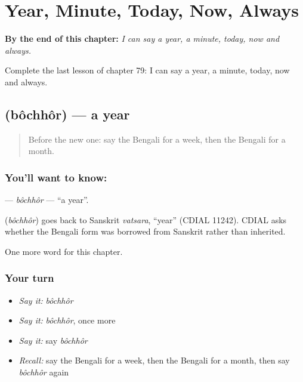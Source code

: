 
\chapter{Year, Minute, Today, Now, Always}
\label{ch:bn-year-minute-today-now-always}

\begin{chapteropening}
\textbf{By the end of this chapter:} \emph{I can say a year, a minute, today, now and always.}

Complete the last lesson of chapter 79: I can say a year, a minute, today, now and always.
\end{chapteropening}

\section[\texorpdfstring{\bn{বছর} (bôchhôr)}{বছর (bôchhôr)}]{ (bôchhôr) — a year}

\label{lesson:BN-C79-bochhor}



\begin{quote}
Before the new one: say the Bengali for a week, then the Bengali for a month.
\end{quote}

\subsection*{You'll want to know: }
\textbf{} — \emph{bôchhôr} — \textquotedblleft{}a year\textquotedblright{}.

\begin{cousinweb}
\textbf{} (\emph{bôchhôr}) goes back to Sanskrit \emph{vatsara}, \textquotedblleft{}year\textquotedblright{} (CDIAL 11242). CDIAL asks whether the Bengali form was borrowed from Sanskrit rather than inherited.
\end{cousinweb}

\begin{grammarlens}[title={What you've built}]
One more word for this chapter.
\end{grammarlens}

\subsection*{Your turn}
\begin{itemize}
\raggedright
  \item \emph{Say it:} \emph{bôchhôr}
  \item \emph{Say it:} \emph{bôchhôr}, once more
  \item \emph{Say it:} say \emph{bôchhôr}
  \item \emph{Recall:} say the Bengali for a week, then the Bengali for a month, then say \emph{bôchhôr} again
\end{itemize}

